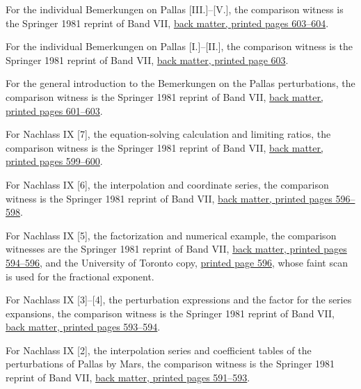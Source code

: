 For the individual Bemerkungen on Pallas [III.]–[V.], the comparison witness is the Springer 1981 reprint of Band VII, \href{https://link.springer.com/content/pdf/bbm:978-3-642-92478-1/1}{back matter, printed pages 603--604}.



For the individual Bemerkungen on Pallas [I.]–[II.], the comparison witness is the Springer 1981 reprint of Band VII, \href{https://link.springer.com/content/pdf/bbm:978-3-642-92478-1/1}{back matter, printed page 603}.



For the general introduction to the Bemerkungen on the Pallas perturbations, the comparison witness is the Springer 1981 reprint of Band VII, \href{https://link.springer.com/content/pdf/bbm:978-3-642-92478-1/1}{back matter, printed pages 601--603}.



For Nachlass IX [7], the equation-solving calculation and limiting ratios, the comparison witness is the Springer 1981 reprint of Band VII, \href{https://link.springer.com/content/pdf/bbm:978-3-642-92478-1/1}{back matter, printed pages 599--600}.



For Nachlass IX [6], the interpolation and coordinate series, the comparison witness is the Springer 1981 reprint of Band VII, \href{https://link.springer.com/content/pdf/bbm:978-3-642-92478-1/1}{back matter, printed pages 596--598}.



For Nachlass IX [5], the factorization and numerical example, the comparison witnesses are the Springer 1981 reprint of Band VII, \href{https://link.springer.com/content/pdf/bbm:978-3-642-92478-1/1}{back matter, printed pages 594--596}, and the University of Toronto copy, \href{https://archive.org/details/werkehrsgvonderg07gausuoft}{printed page 596}, whose faint scan is used for the fractional exponent.



For Nachlass IX [3]–[4], the perturbation expressions and the factor for the series expansions, the comparison witness is the Springer 1981 reprint of Band VII, \href{https://link.springer.com/content/pdf/bbm:978-3-642-92478-1/1}{back matter, printed pages 593--594}.



For Nachlass IX [2], the interpolation series and coefficient tables of the perturbations of Pallas by Mars, the comparison witness is the Springer 1981 reprint of Band VII, \href{https://link.springer.com/content/pdf/bbm:978-3-642-92478-1/1}{back matter, printed pages 591--593}.




